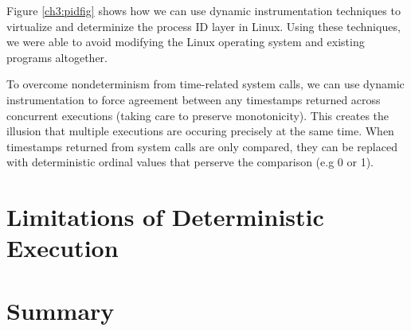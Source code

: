 Figure \ref{ch3:pidfig} shows how we can use dynamic instrumentation
techniques to virtualize and determinize the process ID layer in Linux.
Using these techniques, we were able to avoid modifying
the Linux operating system and existing programs
altogether.

To overcome nondeterminism from time-related system calls,
we can use dynamic instrumentation to force agreement between 
any timestamps returned across concurrent
executions (taking care to preserve monotonicity).
This creates the illusion that multiple executions
are occuring precisely at the same time. When timestamps
returned from system calls are only compared, they
can be replaced with deterministic ordinal values that 
perserve the comparison (e.g 0 or 1). 


\section{Limitations of Deterministic Execution} \label{ch3:issues}
\section {Summary}
